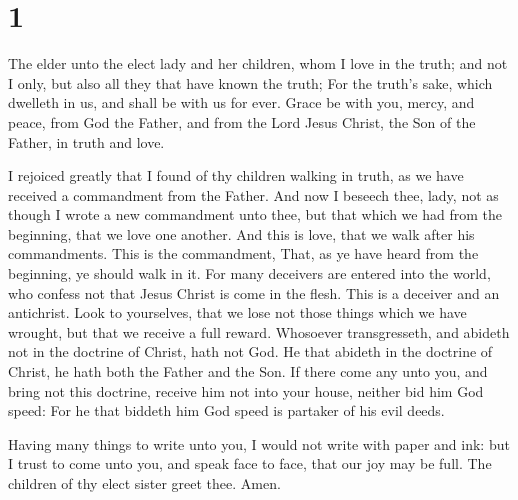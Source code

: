 \hypertarget{section}{%
\section{1}\label{section}}

 The elder unto the elect lady and her children, whom I love
in the truth; and not I only, but also all they that have known the
truth;  For the truth's sake, which dwelleth in us, and
shall be with us for ever.  Grace be with you, mercy, and
peace, from God the Father, and from the Lord Jesus Christ, the Son of
the Father, in truth and love.

 I rejoiced greatly that I found of thy children walking in
truth, as we have received a commandment from the Father. 
And now I beseech thee, lady, not as though I wrote a new commandment
unto thee, but that which we had from the beginning, that we love one
another.  And this is love, that we walk after his
commandments. This is the commandment, That, as ye have heard from the
beginning, ye should walk in it.  For many deceivers are
entered into the world, who confess not that Jesus Christ is come in the
flesh. This is a deceiver and an antichrist.  Look to
yourselves, that we lose not those things which we have wrought, but
that we receive a full reward.  Whosoever transgresseth, and
abideth not in the doctrine of Christ, hath not God. He that abideth in
the doctrine of Christ, he hath both the Father and the Son.
 If there come any unto you, and bring not this doctrine,
receive him not into your house, neither bid him God speed:
 For he that biddeth him God speed is partaker of his evil
deeds.

 Having many things to write unto you, I would not write
with paper and ink: but I trust to come unto you, and speak face to
face, that our joy may be full.  The children of thy elect
sister greet thee. Amen.
